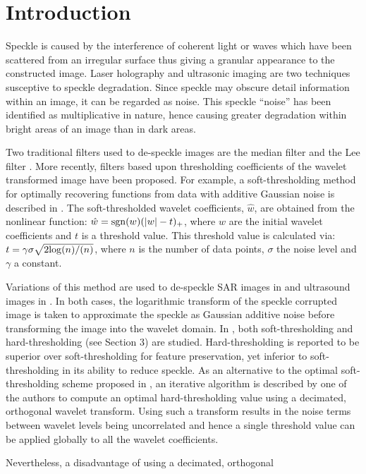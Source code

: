 \documentclass[twocolumn]{article}
\begin{document}
\section{Introduction}
Speckle is caused by the interference of coherent light or waves
which have been scattered from an irregular surface thus giving a granular appearance
to the constructed image. 
Laser holography and
ultrasonic imaging are two techniques susceptive to speckle degradation.  
Since speckle may obscure detail information within an image, 
it can be regarded as noise. This speckle ``noise'' has been identified as multiplicative
in nature, hence causing greater degradation within bright areas of an image than 
in dark areas.
\par Two traditional filters used to de-speckle images are the median filter and the Lee filter \cite{lee80}.
More recently, filters based upon thresholding coefficients of the wavelet transformed image have been 
proposed. For example, 
a soft-thresholding method for optimally recovering 
functions from data with additive Gaussian noise is described in \cite{donoho95}.
The soft-thresholded wavelet coefficients, $\hat{w}$, are obtained from the nonlinear function:
$\hat{w}= {\rm sgn}(w)(|w|-t)_{+}$, where $w$ are the initial wavelet 
coefficients and $t$ is a threshold value.
This threshold value is calculated via: $t=\gamma\sigma\sqrt{2{\rm log}(n)/(n)}$, where $n$ is the number of
data points, $\sigma$ the noise level and $\gamma$ a constant.
\par Variations of this method are used to de-speckle SAR images in \cite{guo94} and ultrasound images 
in \cite{cena96}. In both cases, the logarithmic transform
of the speckle corrupted image is taken to approximate the speckle as Gaussian additive noise
before transforming the image into the wavelet domain.
In \cite{guo94}, both soft-thresholding and hard-thresholding (see Section 3) 
are studied. Hard-thresholding is 
reported to be superior over soft-thresholding for feature preservation, yet inferior to soft-thresholding 
in its ability to reduce speckle.
As an alternative to the optimal soft-thresholding scheme proposed in \cite{donoho95},
an iterative algorithm is described by one of the authors \cite{yu96} to compute an optimal 
hard-thresholding value using a decimated, orthogonal wavelet transform.
Using such a transform results in the noise terms between wavelet levels   
being uncorrelated \cite{lang96} and hence a single threshold value can be applied globally to all the wavelet 
coefficients.
\par Nevertheless, a disadvantage of using a decimated, orthogonal 
\end{document}

